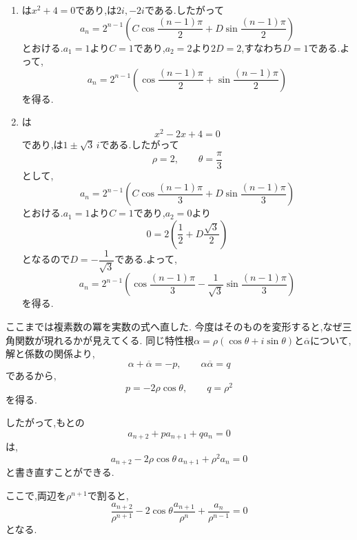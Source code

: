 \begin{enumerate}[label=(\arabic*),parsep=3pt,format=\bookitemlink{example-complex-1}{solution}{problem}]
{\[\]
}
          とおける.$a_1=0$より$C=0$であり,$a_2=1$より$D=1$である.よって,
          \[
            a_n=(\sqrt2)^{n-1}\sin\frac{(n-1)\pi}{4}
          \]
          を得る.
    \item {}は$x^2+4=0$であり,は$2i,-2i$である.したがって
          \[
            a_n=2^{n-1}
            \left(
              C\cos\frac{(n-1)\pi}{2}
              +D\sin\frac{(n-1)\pi}{2}
            \right)
          \]
          とおける.$a_1=1$より$C=1$であり,$a_2=2$より$2D=2$,すなわち$D=1$である.よって,
          \[
            a_n=2^{n-1}
            \left(
              \cos\frac{(n-1)\pi}{2}
              +\sin\frac{(n-1)\pi}{2}
            \right)
          \]
          を得る.
    \item {}は
          \[
            x^2-2x+4=0
          \]
          であり,は$1\pm\sqrt3\,i$である.したがって
          \[
            \rho=2,\qquad\theta=\frac{\pi}{3}
          \]
          として,
          \[
            a_n=2^{n-1}
            \left(
              C\cos\frac{(n-1)\pi}{3}
              +D\sin\frac{(n-1)\pi}{3}
            \right)
          \]
          とおける.$a_1=1$より$C=1$であり,$a_2=0$より
          \[
            0=2\left(\frac12+D\frac{\sqrt3}{2}\right)
          \]
          となるので$D=-\dfrac1{\sqrt3}$である.よって,
          \[
            a_n=2^{n-1}
            \left(
              \cos\frac{(n-1)\pi}{3}
              -\frac1{\sqrt3}\sin\frac{(n-1)\pi}{3}
            \right)
          \]
          を得る.
  \end{enumerate}

\label{解釈：虚数解と加法定理}
  ここまでは複素数の冪を実数の式へ直した.
  今度はそのものを変形すると,なぜ三角関数が現れるかが見えてくる.
  同じ特性根$\alpha=\rho(\cos\theta+i\sin\theta)$と$\overline\alpha$について,解と係数の関係より,
  \[
    \alpha+\overline\alpha=-p,\qquad
    \alpha\overline\alpha=q
  \]
  であるから,
  \[
    p=-2\rho\cos\theta,\qquad
    q=\rho^2
  \]
  を得る.

  したがって,もとの
  \[
    a_{n+2}+pa_{n+1}+qa_n=0
  \]
  は,
  \[
    a_{n+2}
    -2\rho\cos\theta\,a_{n+1}
    +\rho^2a_n=0
  \]
  と書き直すことができる.

  ここで,両辺を$\rho^{n+1}$で割ると,
  \[
    \frac{a_{n+2}}{\rho^{n+1}}
    -2\cos\theta
    \frac{a_{n+1}}{\rho^n}
    +\frac{a_n}{\rho^{n-1}}
    =0
  \]
  となる.

